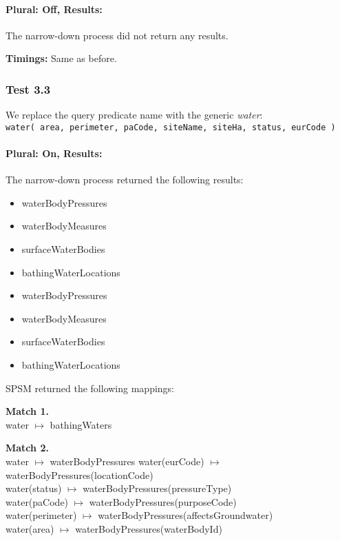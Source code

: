 \documentclass[a4paper,10pt]{article}
\begin{document}
\paragraph{Plural: Off, Results: }The narrow-down process did not return any results.

\textbf{Timings:} Same as before.



\subsubsection{Test 3.3} We replace the query predicate name with the generic \textit{water}:\\
\indent \texttt{water( area, perimeter, paCode, siteName, siteHa, status, eurCode )}

\paragraph{Plural: On, Results: } The narrow-down process returned the following results:

\begin{itemize}
\item waterBodyPressures
\item waterBodyMeasures
\item surfaceWaterBodies
\item bathingWaterLocations
\item waterBodyPressures
\item waterBodyMeasures
\item surfaceWaterBodies
\item bathingWaterLocations
\end{itemize}

SPSM returned the following mappings:

\textbf{Match 1. }\\
water $\mapsto$ bathingWaters 

\textbf{Match 2. }\\
water $\mapsto$ waterBodyPressures
water(eurCode) $\mapsto$  waterBodyPressures(locationCode)\\
water(status) $\mapsto$ waterBodyPressures(pressureType)\\
water(paCode) $\mapsto$  waterBodyPressures(purposeCode)\\
water(perimeter) $\mapsto$  waterBodyPressures(affectsGroundwater)\\
water(area) $\mapsto$  waterBodyPressures(waterBodyId)
\end{document}
